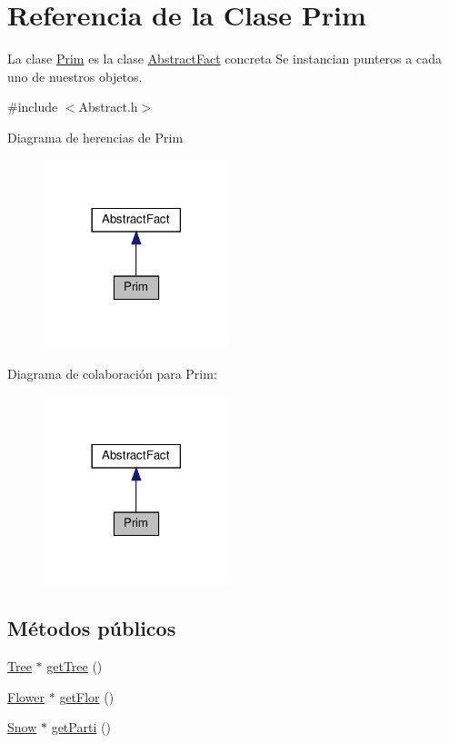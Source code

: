 \hypertarget{classPrim}{}\section{Referencia de la Clase Prim}
\label{classPrim}


La clase \hyperlink{classPrim}{Prim} es la clase \hyperlink{classAbstractFact}{Abstract\+Fact} concreta  Se instancian punteros a cada uno de nuestros objetos.  




{\ttfamily \#include $<$Abstract.\+h$>$}



Diagrama de herencias de Prim
\nopagebreak
\begin{figure}[H]
\begin{center}
\leavevmode
\includegraphics[width=153pt]{classPrim__inherit__graph}
\end{center}
\end{figure}


Diagrama de colaboración para Prim\+:
\nopagebreak
\begin{figure}[H]
\begin{center}
\leavevmode
\includegraphics[width=153pt]{classPrim__coll__graph}
\end{center}
\end{figure}
\subsection*{Métodos públicos}
\begin{DoxyCompactItemize}
\item 
\hyperlink{classTree}{Tree} $\ast$ \hyperlink{classPrim_aeccbb4f2821f8bc508647e2f6dd95370}{get\+Tree} ()
\item 
\hyperlink{classFlower}{Flower} $\ast$ \hyperlink{classPrim_a92e3d118382a67173d008d5d82e4798c}{get\+Flor} ()
\item 
\hyperlink{classSnow}{Snow} $\ast$ \hyperlink{classPrim_ae2c1e853547a33662bd00baff26d67f8}{get\+Parti} ()
\end{DoxyCompactItemize}


